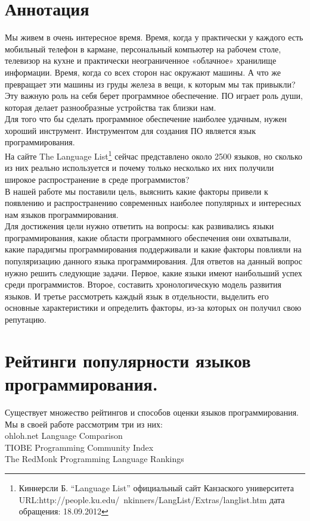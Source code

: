 ﻿\section{Аннотация}
Мы живем в очень интересное время. Время, когда у практически у каждого есть мобильный телефон в кармане, персональный компьютер на рабочем столе, телевизор на кухне и практически неограниченное «облачное» хранилище информации. Время, когда со всех сторон нас окружают машины. А что же превращает эти машины из груды железа в вещи, к которым мы так привыкли? \\
Эту важную роль на себя берет программное обеспечение. ПО играет роль души, которая делает разнообразные устройства так близки нам. \\
Для того что бы сделать программное обеспечение наиболее удачным, нужен хороший инструмент. Инструментом для создания ПО является язык программирования. \\
На сайте The Language List\footnote{Киннерсли Б. ``Language List'' официальный сайт Канзаского университета URL:http://people.ku.edu/~nkinners/LangList/Extras/langlist.htm дата обращения: 18.09.2012}  
сейчас представлено около 2500 языков, но сколько из них реально используется и почему только несколько их них получили широкое распространение в среде программистов? \\
В нашей работе мы поставили цель, выяснить какие факторы привели к появлению и распространению современных наиболее популярных и интересных нам языков программирования. \\
Для достижения цели нужно ответить на вопросы: как развивались языки программирования, какие области программного обеспечения они охватывали, какие парадигмы программирования поддерживали и какие факторы повлияли на популяризацию данного языка программирования. Для ответов на данный вопрос нужно решить следующие задачи. Первое, какие языки имеют наибольший успех среди программистов. Второе, составить хронологическую модель развития языков. 
И третье рассмотреть каждый язык в отдельности, выделить его основные характеристики и определить факторы, из-за которых он получил свою  репутацию.
\section{Рейтинги популярности языков программирования.}
Существует множество рейтингов и способов оценки языков программирования. Мы в своей работе рассмотрим три из них:\\
ohloh.net Language Comparison\\
TIOBE Programming Community Index\\
The RedMonk Programming Language Rankings\\
